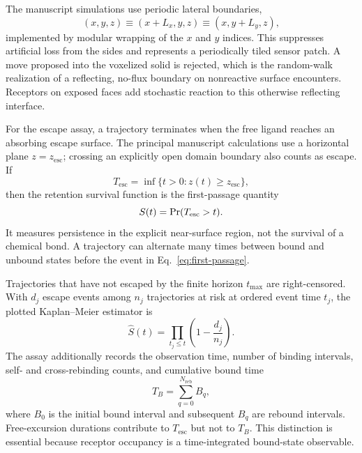 The manuscript simulations use periodic lateral boundaries,
\begin{equation}
 (x,y,z)\equiv(x+L_x,y,z)\equiv(x,y+L_y,z),
 \label{eq:periodic-boundaries}
\end{equation}
implemented by modular wrapping of the $x$ and $y$ indices.  This suppresses
artificial loss from the sides and represents a periodically tiled sensor
patch.  A move proposed into the voxelized solid is rejected, which is the
random-walk realization of a reflecting, no-flux boundary on nonreactive
surface encounters.  Receptors on exposed faces add stochastic reaction to
this otherwise reflecting interface.

For the escape assay, a trajectory terminates when the free ligand reaches an
absorbing escape surface.  The principal manuscript calculations use a
horizontal plane $z=z_{\mathrm{esc}}$; crossing an explicitly open domain
boundary also counts as escape.  If
\begin{equation}
 T_{\mathrm{esc}}=\inf\{t>0:z(t)\ge z_{\mathrm{esc}}\},
 \label{eq:first-passage}
\end{equation}
then the retention survival function is the first-passage quantity
\begin{equation}
 S(t)=\mathop{\mathrm{Pr}}(T_{\mathrm{esc}}>t).
 \label{eq:survival}
\end{equation}
It measures persistence in the explicit near-surface region, not the survival
of a chemical bond.  A trajectory can alternate many times between bound and
unbound states before the event in Eq.~\ref{eq:first-passage}.

Trajectories that have not escaped by the finite horizon $t_{\max}$ are
right-censored.  With $d_j$ escape events among $n_j$ trajectories at risk at
ordered event time $t_j$, the plotted Kaplan--Meier estimator is
\begin{equation}
 \widehat S(t)=\prod_{t_j\le t}\left(1-\frac{d_j}{n_j}\right).
 \label{eq:kaplan-meier}
\end{equation}
The assay additionally records the observation time, number of binding
intervals, self- and cross-rebinding counts, and cumulative bound time
\begin{equation}
 T_B=\sum_{q=0}^{N_{\mathrm{reb}}}B_q,
 \label{eq:cumulative-bound-time}
\end{equation}
where $B_0$ is the initial bound interval and subsequent $B_q$ are rebound
intervals.  Free-excursion durations contribute to $T_{\mathrm{esc}}$ but not
to $T_B$.  This distinction is essential because receptor occupancy is a
time-integrated bound-state observable.
